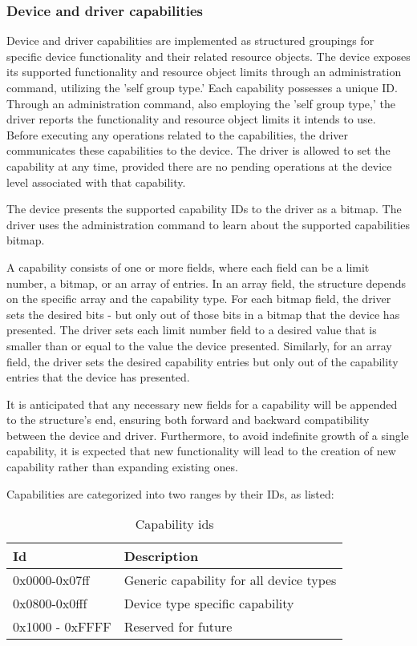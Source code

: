 \subsubsection{Device and driver capabilities}\label{sec:Basic Facilities of a Virtio Device / Device groups / Group administration commands / Device and driver capabilities}

Device and driver capabilities are implemented as structured groupings for
specific device functionality and their related resource objects. The device exposes
its supported functionality and resource object limits through an administration
command, utilizing the 'self group type.' Each capability possesses a
unique ID. Through an administration command, also employing the
'self group type,' the driver reports the functionality and
resource object limits it intends to use. Before executing any operations
related to the capabilities, the driver communicates these
capabilities to the device. The driver is allowed to set the
capability at any time, provided there are no pending operations
at the device level associated with that capability.

The device presents the supported capability IDs to the driver as a bitmap.
The driver uses the administration command to learn about the
supported capabilities bitmap.

A capability consists of one or more fields, where each field can be a
limit number, a bitmap, or an array of entries. In an array field,
the structure depends on the specific array and the capability type.
For each bitmap field, the driver sets the desired bits - but only out of
those bits in a bitmap that the device has presented.
The driver sets each limit number field to a desired value that
is smaller than or equal to the value the device presented.
Similarly, for an array field, the driver sets the desired capability
entries but only out of the capability entries that the device has presented.

It is anticipated that any necessary new fields for a capability will be
appended to the structure's end, ensuring both forward and backward
compatibility between the device and driver. Furthermore, to avoid
indefinite growth of a single capability, it is expected that new
functionality will lead to the creation of new capability rather
than expanding existing ones.

Capabilities are categorized into two ranges by their IDs, as listed:

\begin{table}[H]
\caption{Capability ids}
\label{table:Basic Facilities of a Virtio Device / Device groups / Group administration commands / Device and driver capabilities / capability ids}
\begin{tabularx}{\textwidth}{ |l|X| }
\hline
Id & Description  \\
\hline \hline
0x0000-0x07ff & Generic capability for all device types \\
\hline
0x0800-0x0fff & Device type specific capability \\
\hline
0x1000 - 0xFFFF & Reserved for future \\
\hline
\end{tabularx}
\end{table}

